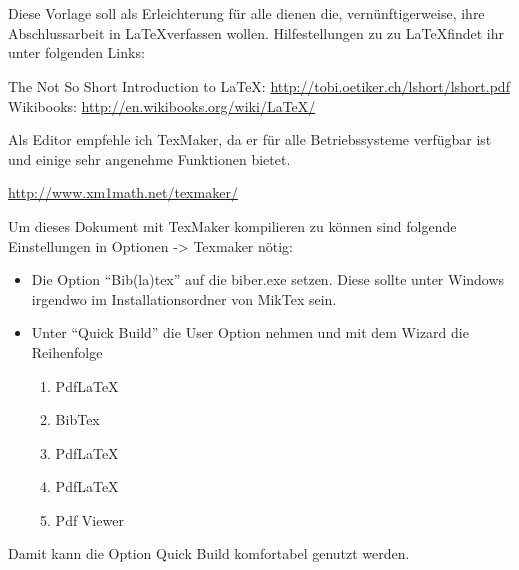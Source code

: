 \chapter*{\abstractname} %
Diese Vorlage soll als Erleichterung für alle dienen die, vernünftigerweise, ihre Abschlussarbeit in \LaTeX verfassen wollen. Hilfestellungen zu zu \LaTeX findet ihr unter folgenden Links:

\begin{center}
The Not So Short Introduction to \LaTeX: \url{http://tobi.oetiker.ch/lshort/lshort.pdf} \\
Wikibooks: \url{http://en.wikibooks.org/wiki/LaTeX/}
\end{center}

Als Editor empfehle ich TexMaker, da er für alle Betriebssysteme verfügbar ist und einige sehr angenehme Funktionen bietet.
\begin{center}\url{http://www.xm1math.net/texmaker/}\end{center}

Um dieses Dokument mit TexMaker kompilieren zu können sind folgende Einstellungen in Optionen -> Texmaker nötig:
\begin{itemize}
\item Die Option \enquote{Bib(la)tex} auf die biber.exe setzen. Diese sollte unter Windows irgendwo im Installationsordner von MikTex sein.
\item Unter \enquote{Quick Build} die User Option nehmen und mit dem Wizard die Reihenfolge
	\begin{enumerate}
	\item PdfLaTeX
	\item BibTex
	\item PdfLaTeX
	\item PdfLaTeX
	\item Pdf Viewer	
	\end{enumerate}
\end{itemize}
Damit kann die Option Quick Build komfortabel genutzt werden.
\newpage
